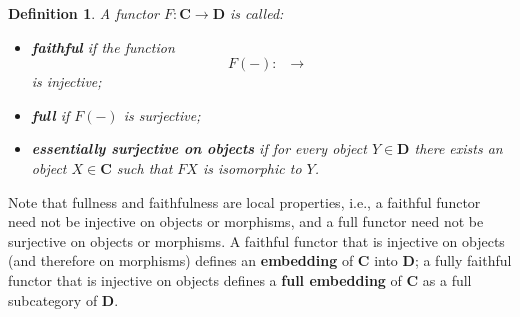 \documentclass[a5paper,oneside,11pt]{article}
\newtheorem{defn}{Definition}
\newcommand\1{\mathord{\mathrm{1}}}
\newcommand\cat[1]{\mathbf{#1}}
\newcommand\Hom[3]{\mathop{\mathsf{Hom}_{\cat{#1}}(#2, #3)}}
\begin{document}
\begin{defn}
    \label{defn:funcprops}
    A functor $F : \cat{C} \longrightarrow \cat{D}$ is called:
    \begin{itemize}
        \item \textbf{faithful} if the function
            $$F(-) : \Hom{C}{X}{Y} \rightarrow \Hom{D}{FX}{FY}$$ is injective;
        \item \textbf{full} if $F(-)$ is surjective;
        \item \textbf{essentially surjective on objects} if for every object
            $Y \in \cat{D}$ there exists an object $X \in \cat{C}$ such that
            $FX$ is isomorphic to $Y$.
    \end{itemize}
\end{defn}
Note that fullness and faithfulness are local properties, i.e.,
a faithful functor need not be injective on objects or morphisms,
and a full functor need not be surjective on objects or morphisms.
A faithful functor that is injective on objects (and therefore on morphisms)
defines an \textbf{embedding} of $\cat{C}$ into $\cat{D}$; a fully faithful functor
that is injective on objects defines a \textbf{full embedding} of $\cat{C}$ as a
full subcategory of $\cat{D}$.
\end{document}
